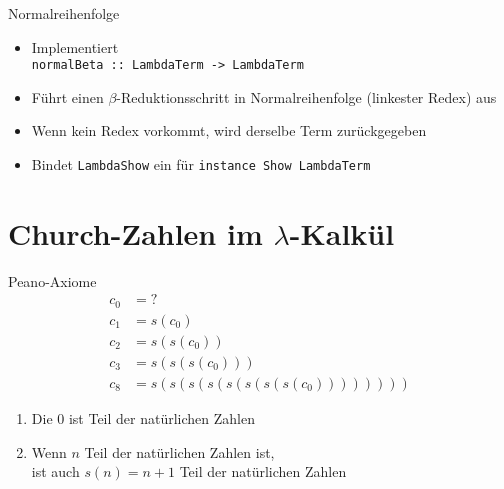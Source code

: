 \documentclass{beamer}
\newcommand{\code}[1]{
	\begin{mdframed}
		
	\end{mdframed}
}
\begin{document}
\begin{frame}{Normalreihenfolge}
	\code{demos/LambdaN.hs}
	\begin{itemize}
		\item Implementiert\\
		      \texttt{normalBeta :: LambdaTerm -> LambdaTerm}
	        \item Führt einen $\beta$-Reduktionsschritt in Normalreihenfolge (linkester Redex) aus
		\item Wenn kein Redex vorkommt, wird derselbe Term zurückgegeben
		\item Bindet \texttt{LambdaShow} ein für \texttt{instance Show LambdaTerm}
	\end{itemize}
\end{frame}


\section{Church-Zahlen im $\lambda$-Kalkül}

\begin{frame}{Peano-Axiome}
	\begin{eqnarray*}
		c_0 &= ?\\
		c_1 &= s (c_0)\\
		c_2 &= s (s (c_0))\\
		c_3 &= s (s (s (c_0)))\\
		c_8 &= s (s (s (s (s (s (s (s (c_0))))))))
	\end{eqnarray*}

	\begin{enumerate}
		\item Die 0 ist Teil der natürlichen Zahlen
		\item Wenn $n$ Teil der natürlichen Zahlen ist,\\
	 	      ist auch $s(n) = n + 1$ Teil der natürlichen Zahlen
	\end{enumerate}
\end{frame}
\end{document}
